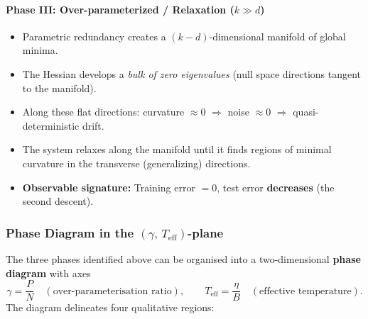 \documentclass[
  journal=largetwo,
  year=2025,
  volume=37,
]{cup-journal}
\begin{document}
\paragraph{Phase III: Over-parameterized / Relaxation ($k \gg d$)}
\begin{itemize}
    \item Parametric redundancy creates a $(k-d)$-dimensional manifold of global minima.
    \item The Hessian develops a \textit{bulk of zero eigenvalues} (null space directions tangent to the manifold).
    \item Along these flat directions: curvature $\approx 0$ $\Rightarrow$ noise $\approx 0$ $\Rightarrow$ quasi-deterministic drift.
    \item The system relaxes along the manifold until it finds regions of minimal curvature in the transverse (generalizing) directions.
    \item \textbf{Observable signature:} Training error $= 0$, test error \textbf{decreases} (the second descent).
\end{itemize}

\subsubsection{Phase Diagram in the $(\gamma,\,T_{\mathrm{eff}})$-plane}\label{sec:phase_diagram}

The three phases identified above can be organised into a two-dimensional \textbf{phase diagram} with axes
\begin{equation}
    \gamma = \frac{P}{N} \quad (\text{over-parameterisation ratio}), \qquad
    T_{\mathrm{eff}} = \frac{\eta}{B} \quad (\text{effective temperature}).
\end{equation}
The diagram delineates four qualitative regions:
\end{document}
